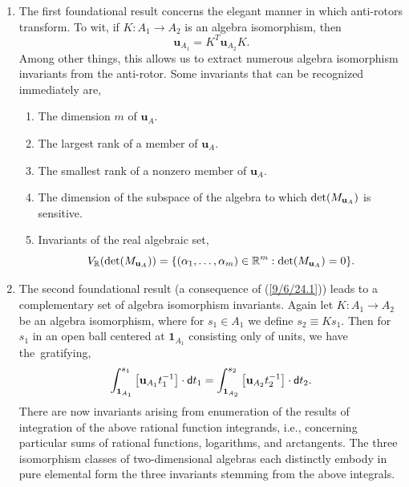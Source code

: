 \documentclass{amsart}
\numberwithin{equation}{section}
\theoremstyle{definition}
\numberwithin{theorem}{section}
\begin{document}
\begin{enumerate} 
\item   The first foundational result concerns the elegant manner in which \mbox{anti-rotors} transform.   To wit, if $K:A_1\rightarrow A_2$ is an algebra isomorphism, then \begin{equation}\label{9/6/24.1} \mathbf{u}_{A_1} = K^T \mathbf{u}_{A_2} K. \end{equation} 
Among other things, this allows us to extract numerous algebra isomorphism invariants from the anti-rotor.    Some invariants that can be recognized immediately are, \begin{enumerate} \item The dimension $m$ of $\mathbf{u}_A$.   \item The largest rank  of a member of $\mathbf{u}_A$.  \item The smallest rank of a nonzero member of $\mathbf{u}_A$. \item The dimension of the subspace of the algebra to which ${\rm det}(M_{\mathbf{u}_A})$ is sensitive. \item Invariants of the real algebraic set, \[V_\mathbb{R}({\rm det}(M_{\mathbf{u}_A})) = \{(\alpha_1,\dots,\alpha_m)\in\mathbb{R}^m: {\rm det}(M_{\mathbf{u}_A}) = 0 \}.\] \end{enumerate}
  \item The second foundational result (a consequence of (\ref{9/6/24.1})) leads to a complementary set of algebra isomorphism invariants.  Again let $K:A_1\rightarrow A_2$ be an algebra isomorphism, where for $s_1\in A_1$ we define $s_2\equiv Ks_1$.  Then for $s_1$ in an open ball centered at $\mathbf{1}_{A_1}$ consisting only of units, we have \mbox{the gratifying}, \begin{equation}\label{8/30/24.1} \int_{{\bf 1}_{A_1}}^{s_1} \left[\mathbf{u}_{A_1}t_1^{-1}\right]\cdot {\sf d}t_1 
= \int_{{\bf 1}_{A_2}}^{s_2} \left[\mathbf{u}_{A_2}t_2^{-1}\right]\cdot {\sf d}t_2 . \end{equation} There are now invariants arising from enumeration of the results of integration of the above rational function integrands, i.e., concerning particular sums of rational functions, logarithms, and arctangents.  The three isomorphism classes of two-dimensional algebras each distinctly embody in pure elemental form the three invariants stemming from the above integrals.

\end{enumerate}
\end{document}

